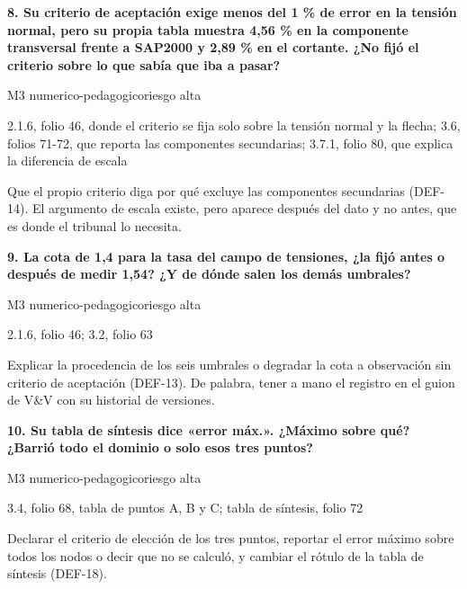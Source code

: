 \vspace{5pt}
\noindent\casilla\textbf{8. Su criterio de aceptación exige menos del 1 \% de error en la tensión normal, pero su propia tabla muestra 4,56 \% en la componente transversal frente a SAP2000 y 2,89 \% en el cortante. ¿No fijó el criterio sobre lo que sabía que iba a pasar?}\par
{\small\color{gris}\sffamily M3 numerico-pedagogico\quad{}\quad riesgo alta}\par
{\small{}2.1.6, folio 46, donde el criterio se fija solo sobre la tensión normal y la flecha; 3.6, folios 71-72, que reporta las componentes secundarias; 3.7.1, folio 80, que explica la diferencia de escala\par}
{\small{}Que el propio criterio diga por qué excluye las componentes secundarias (DEF-14). El argumento de escala existe, pero aparece después del dato y no antes, que es donde el tribunal lo necesita.\par}
\vspace{5pt}
\noindent\casilla\textbf{9. La cota de 1,4 para la tasa del campo de tensiones, ¿la fijó antes o después de medir 1,54? ¿Y de dónde salen los demás umbrales?}\par
{\small\color{gris}\sffamily M3 numerico-pedagogico\quad{}\quad riesgo alta}\par
{\small{}2.1.6, folio 46; 3.2, folio 63\par}
{\small{}Explicar la procedencia de los seis umbrales o degradar la cota a observación sin criterio de aceptación (DEF-13). De palabra, tener a mano el registro en el guion de V\&V con su historial de versiones.\par}
\vspace{5pt}
\noindent\casilla\textbf{10. Su tabla de síntesis dice «error máx.». ¿Máximo sobre qué? ¿Barrió todo el dominio o solo esos tres puntos?}\par
{\small\color{gris}\sffamily M3 numerico-pedagogico\quad{}\quad riesgo alta}\par
{\small{}3.4, folio 68, tabla de puntos A, B y C; tabla de síntesis, folio 72\par}
{\small{}Declarar el criterio de elección de los tres puntos, reportar el error máximo sobre todos los nodos o decir que no se calculó, y cambiar el rótulo de la tabla de síntesis (DEF-18).\par}
